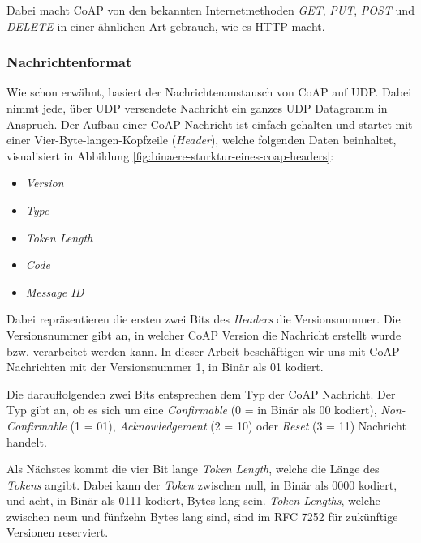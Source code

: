 Dabei macht CoAP von den bekannten Internetmethoden \textit{GET}, \textit{PUT}, \textit{POST} und \textit{DELETE} in einer ähnlichen Art gebrauch, wie es HTTP macht.

\subsubsection{Nachrichtenformat}
\label{subsubsec:nachrichtenformat}

Wie schon erwähnt, basiert der Nachrichtenaustausch von CoAP auf UDP. Dabei nimmt jede, über UDP versendete Nachricht ein ganzes UDP Datagramm in Anspruch. Der Aufbau einer CoAP Nachricht ist einfach gehalten und startet mit einer Vier-Byte-langen-Kopfzeile (\textit{Header}), welche folgenden Daten beinhaltet, visualisiert in Abbildung \ref{fig:binaere-sturktur-eines-coap-headers}:
\begin{itemize}
    \item \textit{Version}
    \item \textit{Type}
    \item \textit{Token Length}
    \item \textit{Code}
    \item \textit{Message ID}
\end{itemize}

Dabei repräsentieren die ersten zwei Bits des \textit{Headers} die Versionsnummer. Die Versionsnummer gibt an, in welcher CoAP Version die Nachricht erstellt wurde bzw. verarbeitet werden kann. In dieser Arbeit beschäftigen wir uns mit CoAP Nachrichten mit der Versionsnummer 1, in Binär als 01 kodiert.

Die darauffolgenden zwei Bits entsprechen dem Typ der CoAP Nachricht. Der Typ gibt an, ob es sich um eine \textit{Confirmable} (0 = in Binär als 00 kodiert), \textit{Non-Confirmable} (1 = 01), \textit{Acknowledgement}  (2 = 10) oder \textit{Reset} (3 = 11) Nachricht handelt.

Als Nächstes kommt die vier Bit lange \textit{Token Length}, welche die Länge des \textit{Tokens} angibt. Dabei kann der \textit{Token} zwischen null, in Binär als 0000 kodiert, und acht, in Binär als 0111 kodiert, Bytes lang sein. \textit{Token Lengths}, welche zwischen neun und fünfzehn Bytes lang sind, sind im RFC 7252 \autocite{RFC7252} für zukünftige Versionen reserviert.

